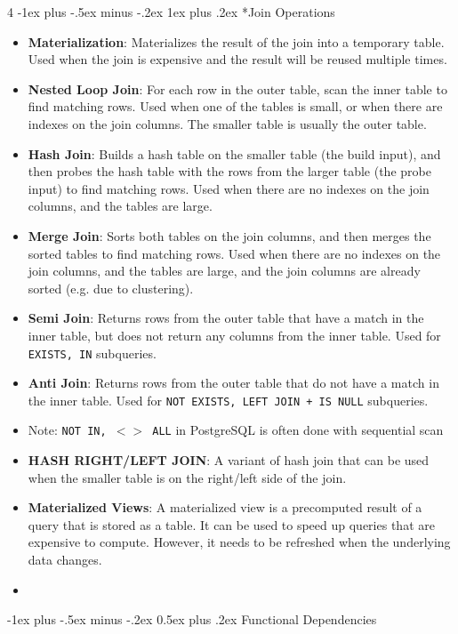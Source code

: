 \documentclass[10pt, landscape]{article}
\makeatletter
\renewcommand{\section}{\@startsection{section}{1}{0mm}%
  {-1ex plus -.5ex minus -.2ex}%
  {0.5ex plus .2ex}%
{\normalfont\large\bfseries}}
\renewcommand{\subsubsection}{\@startsection{subsubsection}{3}{0mm}%
  {-1ex plus -.5ex minus -.2ex}%
  {1ex plus .2ex}%
{\normalfont\small\bfseries}}%
\makeatother
\begin{document}
\begin{multicols*}{4}
  \subsubsection*{Join Operations}
  \begin{itemize}
    \item \textbf{Materialization}: Materializes the result of the join into a temporary table. Used when the join is expensive and the result will be reused multiple times.
    \item \textbf{Nested Loop Join}: For each row in the outer table, scan the inner table to find matching rows. Used when one of the tables is small, or when there are indexes on the join columns. The smaller table is usually the outer table.
    \item \textbf{Hash Join}: Builds a hash table on the smaller table (the build input), and then probes the hash table with the rows from the larger table (the probe input) to find matching rows. Used when there are no indexes on the join columns, and the tables are large.
    \item \textbf{Merge Join}: Sorts both tables on the join columns, and then merges the sorted tables to find matching rows. Used when there are no indexes on the join columns, and the tables are large, and the join columns are already sorted (e.g. due to clustering).
    \item \textbf{Semi Join}: Returns rows from the outer table that have a match in the inner table, but does not return any columns from the inner table. Used for \texttt{EXISTS, IN} subqueries.
    \item \textbf{Anti Join}: Returns rows from the outer table that do not have a match in the inner table. Used for \texttt{NOT EXISTS, LEFT JOIN + IS NULL} subqueries.
    \item Note: \texttt{NOT IN, $<>$ ALL} in PostgreSQL is often done with sequential scan
    \item \textbf{HASH RIGHT/LEFT JOIN}: A variant of hash join that can be used when the smaller table is on the right/left side of the join.
    \item \textbf{Materialized Views}: A materialized view is a precomputed result of a query that is stored as a table. It can be used to speed up queries that are expensive to compute. However, it needs to be refreshed when the underlying data changes.
    \item 
  \end{itemize}


  \section{Functional Dependencies}


\end{multicols*}
\end{document}
